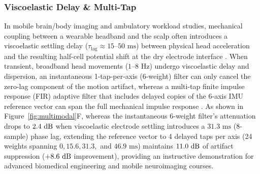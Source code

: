 \documentclass[11pt]{article}
\begin{document}
\subsubsection{Viscoelastic Delay \& Multi-Tap}
In mobile brain/body imaging and ambulatory workload studies, mechanical coupling between a wearable headband and the scalp often introduces a viscoelastic settling delay ($\tau_{\text{lag}} \approx 15\text{--}50\text{ ms}$) between physical head acceleration and the resulting half-cell potential shift at the dry electrode interface \citep{rosanne2021adaptive,klug2022bemobil}. When transient, broadband head movements ($1\text{--}8\text{ Hz}$) undergo viscoelastic delay and dispersion, an instantaneous 1-tap-per-axis (6-weight) filter can only cancel the zero-lag component of the motion artifact, whereas a multi-tap finite impulse response (FIR) adaptive filter that includes delayed copies of the 6-axis IMU reference vector can span the full mechanical impulse response \citep{widrow1975adaptive,rosanne2021adaptive}. As shown in Figure~\ref{fig:multimodal}F, whereas the instantaneous 6-weight filter's attenuation drops to $2.4\text{ dB}$ when viscoelastic electrode settling introduces a $31.3\text{ ms}$ (8-sample) phase lag, extending the reference vector to 4 delayed taps per axis (24 weights spanning $0, 15.6, 31.3,$ and $46.9\text{ ms}$) maintains $11.0\text{ dB}$ of artifact suppression ($+8.6\text{ dB}$ improvement), providing an instructive demonstration for advanced biomedical engineering and mobile neuroimaging courses.
\end{document}
